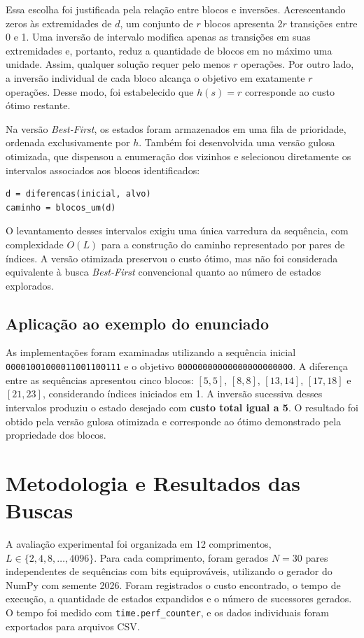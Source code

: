 \documentclass[conference,a4paper]{IEEEtran}
\begin{document}
Essa escolha foi justificada pela relação entre blocos e inversões. Acrescentando zeros às extremidades de $d$, um conjunto de $r$ blocos apresenta $2r$ transições entre 0 e 1. Uma inversão de intervalo modifica apenas as transições em suas extremidades e, portanto, reduz a quantidade de blocos em no máximo uma unidade. Assim, qualquer solução requer pelo menos $r$ operações. Por outro lado, a inversão individual de cada bloco alcança o objetivo em exatamente $r$ operações. Desse modo, foi estabelecido que $h(s)=r$ corresponde ao custo ótimo restante.

Na versão \textit{Best-First}, os estados foram armazenados em uma fila de prioridade, ordenada exclusivamente por $h$. Também foi desenvolvida uma versão gulosa otimizada, que dispensou a enumeração dos vizinhos e selecionou diretamente os intervalos associados aos blocos identificados:
\begin{lstlisting}
d = diferencas(inicial, alvo)
caminho = blocos_um(d)
\end{lstlisting}
O levantamento desses intervalos exigiu uma única varredura da sequência, com complexidade $O(L)$ para a construção do caminho representado por pares de índices. A versão otimizada preservou o custo ótimo, mas não foi considerada equivalente à busca \textit{Best-First} convencional quanto ao número de estados explorados.

\subsection{Aplicação ao exemplo do enunciado}
As implementações foram examinadas utilizando a sequência inicial \texttt{00001001000011001100111} e o objetivo \texttt{00000000000000000000000}. A diferença entre as sequências apresentou cinco blocos: $[5,5]$, $[8,8]$, $[13,14]$, $[17,18]$ e $[21,23]$, considerando índices iniciados em 1. A inversão sucessiva desses intervalos produziu o estado desejado com \textbf{custo total igual a 5}. O resultado foi obtido pela versão gulosa otimizada e corresponde ao ótimo demonstrado pela propriedade dos blocos.

\section{Metodologia e Resultados das Buscas}
A avaliação experimental foi organizada em 12 comprimentos, $L\in\{2,4,8,\ldots,4096\}$. Para cada comprimento, foram gerados $N=30$ pares independentes de sequências com bits equiprováveis, utilizando o gerador do NumPy com semente 2026. Foram registrados o custo encontrado, o tempo de execução, a quantidade de estados expandidos e o número de sucessores gerados. O tempo foi medido com \texttt{time.perf\_counter}, e os dados individuais foram exportados para arquivos CSV.
\end{document}
